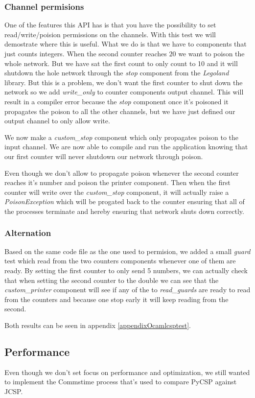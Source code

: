 \documentclass[a4paper,12pt]{article}
\begin{document}
\subsubsection{Channel permisions}
One of the features this API has is that you have the possibility to set 
read/write/poision permissions on the channels. With this test we will
demostrate where this is useful. What we do is that we have to components
that just counts integers. When the second counter reaches $20$ we want
to poison the whole network. But we have sat the first count to only count
to 10 and it will shutdown the hole network through the {\it stop}
component from the {\it Legoland} library. But this is a problem, we don't
want the first counter to shut down the network so we add {\it write\_only}
to counter components output channel. This will result in a compiler error
because the {\it stop} component once it's poisoned it propagates the poison
to all the other channels, but we have just defined our output channel to
only allow write.

We now make a {\it custom\_stop} component which only propagates poison to
the input channel. We are now able to compile and run the application knowing
that our first counter will never shutdown our network through poison.

Even though we don't allow to propagate poison whenever the second counter
reaches it's number and poison the printer component. Then when the first
counter will write over the {\it custom\_stop} component, it will actually
raise a {\it PoisonException} which will be progated back to the counter
ensuring that all of the processes terminate and hereby ensuring that network
shuts down correctly.

\subsubsection{Alternation}
Based on the same code file as the one used to permision, we added a small
{\it guard} test which read from the two counters components whenever one of
them are ready. By setting the first counter to only send 5 numbers, we can
actually check that when setting the second counter to the double we can see
that the {\it custom\_printer} component will see if any of the to
{\it read\_guards} are ready to read from the counters and because one stop
early it will keep reading from the second.

Both results can be seen in appendix \ref{appendixOcamlcsptest}.

\subsection{Performance}
\label{performance}
Even though we don't set focus on performance and optimization, we still wanted
to implement the Commstime\cite{vinterpycsp} process that's used to compare
PyCSP against JCSP.
\end{document}
